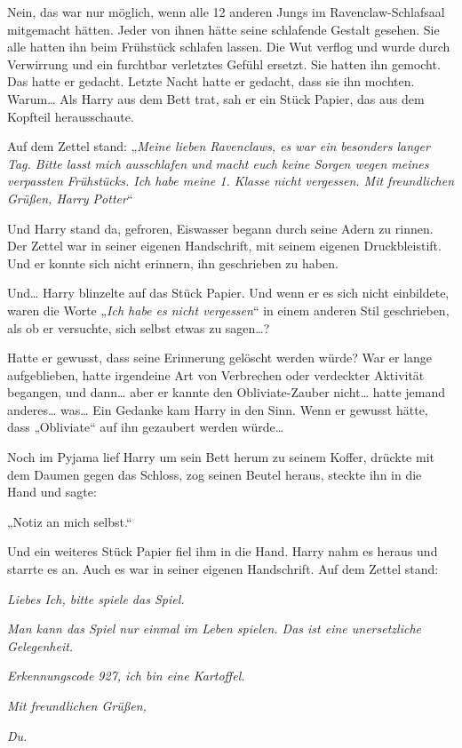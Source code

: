 {Nein, das war nur möglich, wenn alle 12 anderen Jungs im Ravenclaw-Schlafsaal mitgemacht hätten. Jeder von ihnen hätte seine schlafende Gestalt gesehen. Sie alle hatten ihn beim Frühstück schlafen lassen. Die Wut verflog und wurde durch Verwirrung und ein furchtbar verletztes Gefühl ersetzt. Sie hatten ihn gemocht. Das hatte er gedacht. Letzte Nacht hatte er gedacht, dass sie ihn mochten. Warum… Als Harry aus dem Bett trat, sah er ein Stück Papier, das aus dem Kopfteil herausschaute.

Auf dem Zettel stand: „\emph{Meine lieben Ravenclaws, es war ein besonders langer Tag. Bitte lasst mich ausschlafen und macht euch keine Sorgen wegen meines verpassten Frühstücks. Ich habe meine 1. Klasse nicht vergessen. Mit freundlichen Grüßen, Harry Potter}“

Und Harry stand da, gefroren, Eiswasser begann durch seine Adern zu rinnen. Der Zettel war in seiner eigenen Handschrift, mit seinem eigenen Druckbleistift. Und er konnte sich nicht erinnern, ihn geschrieben zu haben.

Und… Harry blinzelte auf das Stück Papier. Und wenn er es sich nicht einbildete, waren die Worte „\emph{Ich habe es nicht vergessen}“ in einem anderen Stil geschrieben, als ob er versuchte, sich selbst etwas zu sagen…?

Hatte er gewusst, dass seine Erinnerung gelöscht werden würde? War er lange aufgeblieben, hatte irgendeine Art von Verbrechen oder verdeckter Aktivität begangen, und dann… aber er kannte den Obliviate-Zauber nicht… hatte jemand anderes… was… Ein Gedanke kam Harry in den Sinn. Wenn er gewusst hätte, dass „Obliviate“ auf ihn gezaubert werden würde…

Noch im Pyjama lief Harry um sein Bett herum zu seinem Koffer, drückte mit dem Daumen gegen das Schloss, zog seinen Beutel heraus, steckte ihn in die Hand und sagte:

„Notiz an mich selbst.“

Und ein weiteres Stück Papier fiel ihm in die Hand. Harry nahm es heraus und starrte es an. Auch es war in seiner eigenen Handschrift. Auf dem Zettel stand:

\emph{Liebes Ich, bitte spiele das Spiel.}

\emph{Man kann das Spiel nur einmal im Leben spielen. Das ist eine unersetzliche Gelegenheit.}

\emph{Erkennungscode 927, ich bin eine Kartoffel.}

\emph{Mit freundlichen Grüßen,}

\emph{Du.}

}
